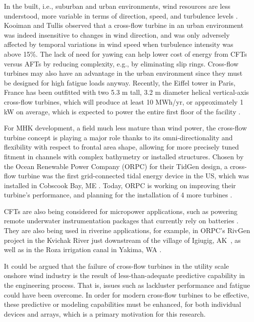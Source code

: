 
In the built, i.e., suburban and urban environments, wind resources are less
understood, more variable in terms of direction, speed, and turbulence levels
\cite{Smith2012}. Kooiman and Tullis \cite{Kooiman2010} observed that a
cross-flow turbine in an urban environment was indeed insensitive to changes in
wind direction, and was only adversely affected by temporal variations in wind
speed when turbulence intensity was above 15\%. The lack of need for yawing can
help lower cost of energy from CFTs versus AFTs by reducing complexity, e.g., by
eliminating slip rings. Cross-flow turbines may also have an advantage in the
urban environment since they must be designed for high fatigue loads anyway.
Recently, the Eiffel tower in Paris, France has been outfitted with two 5.3 m
tall, 3.2 m diameter helical vertical-axis cross-flow turbines, which will
produce at least 10 MWh/yr, or approximately 1 kW on average, which is expected
to power the entire first floor of the facility \cite{Lott2015}.

For MHK development, a field much less mature than wind power, the cross-flow
turbine concept is playing a major role thanks to its omni-directionality and
flexibility with respect to frontal area shape, allowing for more precisely
tuned fitment in channels with complex bathymetry or installed structures.
Chosen by the Ocean Renewable Power Company (ORPC) for their TidGen design, a
cross-flow turbine was the first grid-connected tidal energy device in the US,
which was installed in Cobscook Bay, ME \cite{ORPC2012}. Today, ORPC is working
on improving their turbine's performance, and planning for the installation of 4
more turbines \cite{Nelson2013}.

CFTs are also being considered for micropower applications, such as powering
remote underwater instrumentation packages that currently rely on batteries
\cite{Polagye2013b}. They are also being used in riverine applications, for
example, in ORPC's RivGen project in the Kvichak River just downstream of the
village of Igiugig, AK~\cite{Forbush2015}, as well as in the Roza irrigation
canal in Yakima, WA \cite{Gunawan2014}.

It could be argued that the failure of cross-flow turbines in the utility scale
onshore wind industry is the result of less-than-adequate predictive capability
in the engineering process. That is, issues such as lackluster performance and
fatigue could have been overcome. In order for modern cross-flow turbines to be
effective, these predictive or modeling capabilities must be enhanced, for both
individual devices and arrays, which is a primary motivation for this research.


